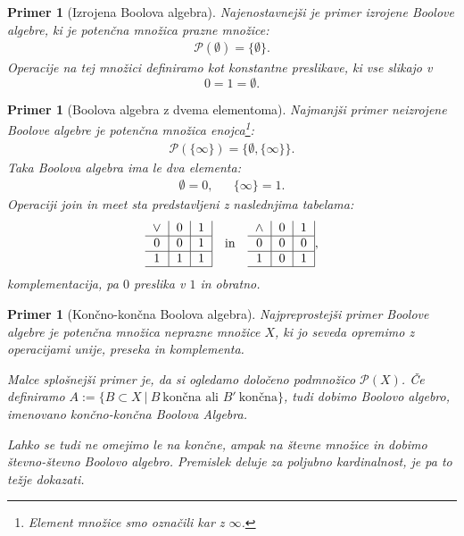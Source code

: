 \documentclass{amsart}
\newtheorem{primer}[izrek]{Primer}
\begin{document}
\begin{primer}[Izrojena Boolova algebra]
    Najenostavnejši je primer izrojene Boolove algebre, ki je potenčna množica prazne množice:
    \begin{align*}
        \mathcal{P}\left(\emptyset\right) = \{\emptyset\}.
    \end{align*}
    Operacije na tej množici definiramo kot konstantne preslikave, ki vse slikajo v \[0 = 1 = \emptyset.\]
\end{primer}

\begin{primer}[Boolova algebra z dvema elementoma]
    Najmanjši primer neizrojene Boolove algebre je potenčna množica enojca\footnote{Element množice smo označili kar z \(\infty\).}:
    \begin{align*}
        \mathcal{P}\left(\{\infty\}\right) = \{\emptyset, \{\infty\}\}.
    \end{align*}
    Taka Boolova algebra ima le dva elementa:
    \begin{align*}
        \emptyset = 0, && \{\infty\} = 1.
    \end{align*}
    Operaciji join in meet sta predstavljeni z naslednjima tabelama:
    \begin{align*}
    \begin{tabular}{c|c|c|}
        \(\vee\) & $0$ & $1$ \\
        \hline
        $0$ & \(0\) &$1$ \\
        \hline
        $1$ & \(1\) & $1$ \\
        \hline
    \end{tabular}&& \text{in} &&
    \begin{tabular}{c|c|c|}
        \(\wedge\) & $0$ & $1$ \\
        \hline
        $0$ & $0$ &$0$ \\
        \hline
        $1$ & $0$ & $1$ \\
        \hline
    \end{tabular},
\end{align*}
komplementacija, pa $0$ preslika v $1$ in obratno.
\end{primer}

\begin{primer}[Končno-končna Boolova algebra]
    Najpreprostejši primer Boolove algebre je potenčna množica neprazne množice \(X\), ki jo seveda opremimo z operacijami unije,
    preseka in komplementa. 
    
    Malce splošnejši primer je, da si ogledamo določeno podmnožico \(\mathcal{P}\left(X\right)\).
    Če definiramo \(A := \{B \subset X~|~B~\text{končna  ali } B'~\text{končna}\}\), tudi dobimo Boolovo algebro, imenovano
    končno-končna Boolova Algebra.

    Lahko se tudi ne omejimo le na končne, ampak na števne množice in dobimo števno-števno Boolovo algebro.
    Premislek deluje za poljubno kardinalnost, je pa to težje dokazati.
\end{primer}
\end{document}
